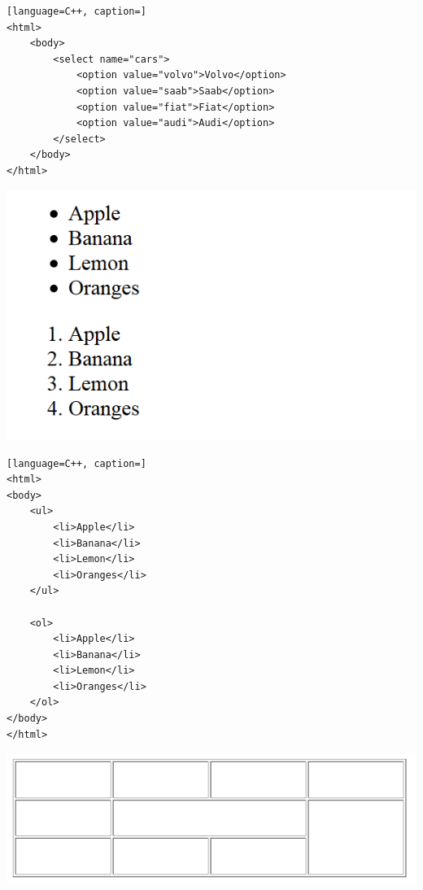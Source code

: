 \documentclass[12pt]{article}
\begin{document}
\begin{latin}
\begin{lstlisting}[language=C++, caption=]
<html>
	<body>
		<select name="cars">
			<option value="volvo">Volvo</option>
			<option value="saab">Saab</option>
			<option value="fiat">Fiat</option>
			<option value="audi">Audi</option>
		</select>
	</body>
</html>
\end{lstlisting}
\end{latin}


\newpage


\begin{LTR}
\includegraphics[scale=0.6]{./2.png}
\end{LTR}



\begin{latin}
\begin{lstlisting}[language=C++, caption=]
<html>
<body>
	<ul>
		<li>Apple</li>
		<li>Banana</li>
		<li>Lemon</li>
		<li>Oranges</li>
	</ul>
	
	<ol>
		<li>Apple</li>
		<li>Banana</li>
		<li>Lemon</li>
		<li>Oranges</li>
	</ol>
</body>
</html>
\end{lstlisting}
\end{latin}




\newpage


\begin{center}
	\includegraphics[scale=0.6]{./3.png}
\end{center}
\end{document}
